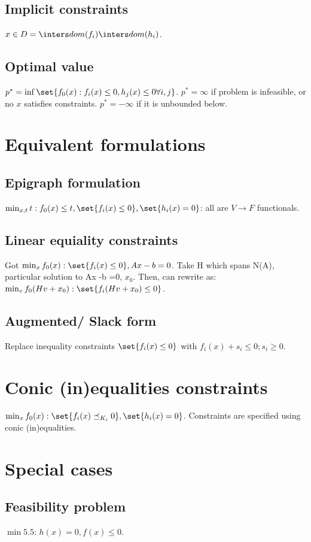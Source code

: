 \documentclass[oneside, article]{memoir}
\begin{document}
\subsection{Implicit constraints}
$x \in D  = \inters dom(f_i) \inters dom(h_i)$.

\subsection{Optimal value}
$p^{*} = \inf \set{f_{0}(x): f_{i}(x) \leq 0, h_j(x) \leq 0 \forall i, j}$. $p^{*} = \infty$ if problem is infeasible, or no $x$ satisfies constraints. $p^{*} = - \infty$ if it is unbounded below.

\section{Equivalent formulations}
\subsection{Epigraph formulation}
$\min_{x,t} t: f_{0}(x) \leq t, \set{f_{i}(x) \leq 0}, \set{h_{i}(x) = 0} $: all are $V \to F$ functionals.

\subsection{Linear equiality constraints}
Got $\min_x f_{0}(x): \set{f_{i}(x) \leq 0}, Ax-b = 0$. Take H which spans N(A), particular solution to Ax -b =0, $x_0$. Then, can rewrite as: $\min_v f_{0}(Hv + x_0): \set{f_{i}(Hv + x_0) \leq 0}$.


\subsection{Augmented/ Slack form}
Replace inequality constraints $\set{f_{i}(x) \leq 0}$ with $f_i(x) + s_i \leq 0; s_i \geq 0$.

\section{Conic (in)equalities constraints}
$\min_x f_{0}(x): \set{f_{i}(x) \preceq_{K_i} 0}, \set{h_{i}(x) = 0} $. Constraints are specified using conic (in)equalities.

\section{Special cases}
\subsection{Feasibility problem}
$\min 5.5$: $h(x) = 0, f(x) \leq 0$.
\end{document}
